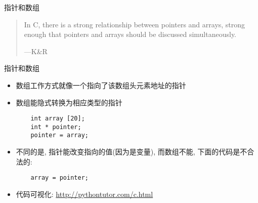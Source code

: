 \begin{frame}[fragile]{指针和数组}
    \begin{quote}
        In C, there is a strong relationship between pointers and arrays, strong enough that pointers and arrays should be discussed simultaneously.

        \hspace*{\fill} ---K\&R
    \end{quote}
\end{frame}

\begin{frame}[fragile]{指针和数组}
    \begin{itemize}[<+- | alert@+>]
        \item 数组工作方式就像一个指向了该数组头元素地址的指针
        \item 数组能隐式转换为相应类型的指针
        \begin{verbatim}
    int array [20];
    int * pointer;
    pointer = array;
        \end{verbatim}
        \item 不同的是, 指针能改变指向的值(因为是变量), 而数组不能, 下面的代码是不合法的:
        \begin{verbatim}
    array = pointer;
        \end{verbatim}
        \item 代码可视化: \href{http://pythontutor.com/c.html#code=\%23include\%20\%3Cstdio.h\%3E\%0A\%0Aint\%20main\%20\%28\%29\%0A\%7B\%0A\%20\%20int\%20numbers\%5B5\%5D\%3B\%0A\%20\%20int\%20*\%20p\%3B\%0A\%0A\%20\%20p\%20\%3D\%20numbers\%3B\%0A\%20\%20*p\%20\%3D\%2010\%3B\%0A\%0A\%20\%20p\%2B\%2B\%3B\%0A\%20\%20*p\%20\%3D\%2020\%3B\%0A\%0A\%20\%20p\%20\%3D\%20\%26numbers\%5B2\%5D\%3B\%0A\%20\%20*p\%20\%3D\%2030\%3B\%0A\%0A\%20\%20p\%20\%3D\%20numbers\%20\%2B\%203\%3B\%0A\%20\%20*p\%20\%3D\%2040\%3B\%0A\%0A\%20\%20p\%20\%3D\%20numbers\%3B\%0A\%20\%20*\%28p\%2B4\%29\%20\%3D\%2050\%3B\%0A\%0A\%20\%20for\%20\%28int\%20n\%3D0\%3B\%20n\%3C5\%3B\%20n\%2B\%2B\%29\%0A\%20\%20\%20\%20printf\%28\%22\%25d,\%20\%22,\%20numbers\%5Bn\%5D\%29\%3B\%0A\%20\%20return\%200\%3B\%0A\%7D\%0A&mode=edit&origin=opt-frontend.js&py=c&rawInputLstJSON=\%5B\%5D}{http://pythontutor.com/c.html}
    \end{itemize}
\end{frame}

